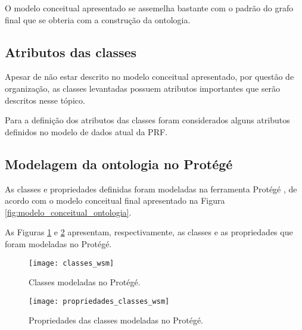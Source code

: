 	  O modelo conceitual apresentado se assemelha bastante com o padrão do grafo final que se obteria com a construção da
	  ontologia.
      
      \vfill
      \pagebreak
      \subsection{Atributos das classes}
	
	  Apesar de não estar descrito no modelo conceitual apresentado, por questão de organização, as classes levantadas
	  possuem atributos importantes que serão descritos nesse tópico.
	  
	  Para a definição dos atributos das classes foram considerados alguns atributos definidos no modelo de dados atual
	  da PRF.
	  
	  
      
      \pagebreak
      \subsection{Modelagem da ontologia no Protégé}
      
	As classes e propriedades definidas foram modeladas na ferramenta Protégé \footnotemark[2],
	de acordo com o modelo conceitual final	apresentado na Figura \ref{fig:modelo_conceitual_ontologia}.
	
	As Figuras \ref{fig:classes_protege} e \ref{fig:propriedades_protege} apresentam, respectivamente, as classes e
	as propriedades que foram modeladas no Protégé.
	
	\begin{figure}[!htb]
	  \centering
	  \texttt{[image: classes\_wsm]}
	  \caption[Classes modeladas no Protégé]{Classes modeladas no Protégé.}
	  \label{fig:classes_protege}
	\end{figure}
	
	\begin{figure}[!htb]
	  \centering
	  \texttt{[image: propriedades\_classes\_wsm]}
	  \caption[Propriedades das classes modeladas no Protégé]{Propriedades das classes modeladas no Protégé.}
	  \label{fig:propriedades_protege}
	\end{figure}
	
      \pagebreak
      
